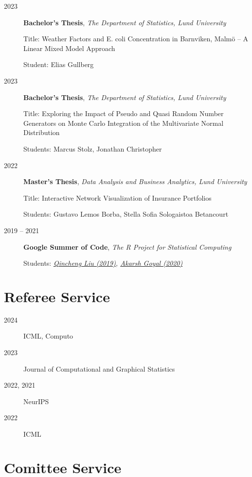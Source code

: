 \documentclass[english,a4paper]{article}
\renewcommand*{%
  \mkbibnamegiven
}[1]{\ifitemannotation{highlight}{\textbf{#1}}{#1}}
\renewcommand*{%
  \mkbibnamefamily
}[1]{\ifitemannotation{highlight}{\textbf{#1}}{#1}}
\begin{document}
\begin{description}
  \item[2023] {
        \textbf{Bachelor's Thesis}, \emph{The Department of Statistics, Lund University}

        Title: Weather Factors and E. coli Concentration in Barnviken, Malmö -- A Linear Mixed Model Approach

        Student: Elias Gullberg
        }
  \item[2023] {
        \textbf{Bachelor's Thesis}, \emph{The Department of Statistics, Lund University}

        Title: Exploring the Impact of Pseudo and Quasi Random Number Generators on Monte Carlo Integration of the Multivariate Normal Distribution

        Students: Marcus Stolz, Jonathan Christopher
        }
  \item[2022] {
        \textbf{Master's Thesis}, \emph{Data Analysis and Business Analytics, Lund University}

        Title: Interactive Network Visualization of Insurance Portfolios

        Students: Gustavo Lemos Borba, Stella Sofia Sologaistoa Betancourt
        }
  \item[2019 -- 2021]{\textbf{Google Summer of Code}, \emph{The R Project for Statistical Computing}

        Students: \emph{\href{https://summerofcode.withgoogle.com/archive/2019/projects/4654960430546944}{Qincheng Liu (2019)}, \href{https://summerofcode.withgoogle.com/archive/2020/projects/5476086193848320}{Akarsh Goyal (2020)}}
        }
\end{description}

\section{Referee Service}

\begin{description}
  \item[2024]{ICML, Computo}
  \item[2023]{Journal of Computational and Graphical Statistics}
  \item[2022, 2021]{NeurIPS}
  \item[2022]{ICML}
\end{description}

\section{Comittee Service}
\end{document}
